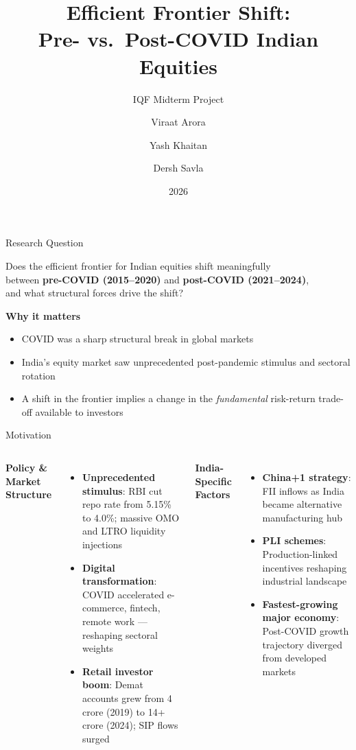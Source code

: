 \documentclass[aspectratio=169]{beamer}
\title{Efficient Frontier Shift:\\Pre- vs.\ Post-COVID Indian Equities}
\subtitle{IQF Midterm Project}
\author{Viraat Arora \and Yash Khaitan \and Dersh Savla}
\date{2026}
\begin{document}
\maketitle

\begin{frame}{Research Question}
  \begin{block}{}
    \centering\large
    Does the efficient frontier for Indian equities shift meaningfully\\
    between \textbf{pre-COVID (2015--2020)} and \textbf{post-COVID (2021--2024)},\\
    and what structural forces drive the shift?
  \end{block}

  \vspace{1em}
  \textbf{Why it matters}
  \begin{itemize}
    \item COVID was a sharp structural break in global markets
    \item India's equity market saw unprecedented post-pandemic stimulus and sectoral rotation
    \item A shift in the frontier implies a change in the \emph{fundamental} risk-return trade-off available to investors
  \end{itemize}
\end{frame}
\begin{frame}{Motivation}
  
  \vspace{0.3em}
  \small
  \begin{columns}[T]
      \textbf{Policy \& Market Structure}
      \begin{itemize}
        \item \textbf{Unprecedented stimulus}: RBI cut repo rate from 5.15\% to 4.0\%; massive OMO and LTRO liquidity injections
        \item \textbf{Digital transformation}: COVID accelerated e-commerce, fintech, remote work --- reshaping sectoral weights
        \item \textbf{Retail investor boom}: Demat accounts grew from 4 crore (2019) to 14+ crore (2024); SIP flows surged
      \end{itemize}

      \textbf{India-Specific Factors}
      \begin{itemize}
        \item \textbf{China+1 strategy}: FII inflows as India became alternative manufacturing hub
        \item \textbf{PLI schemes}: Production-linked incentives reshaping industrial landscape
        \item \textbf{Fastest-growing major economy}: Post-COVID growth trajectory diverged from developed markets
      \end{itemize}
  \end{columns}
\end{frame}
\end{document}
